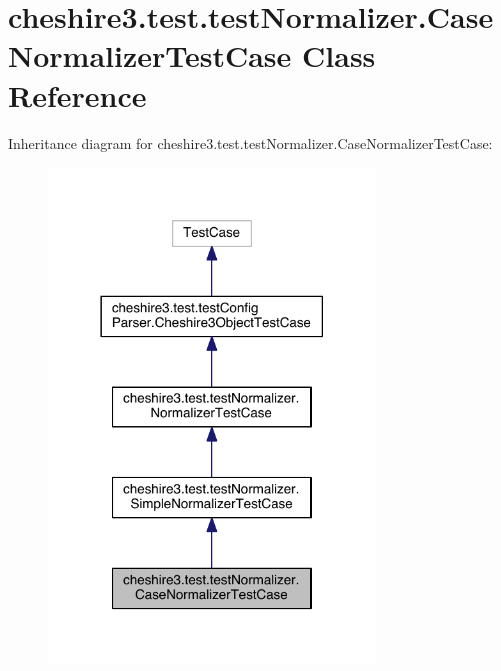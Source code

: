 \hypertarget{classcheshire3_1_1test_1_1test_normalizer_1_1_case_normalizer_test_case}{\section{cheshire3.\-test.\-test\-Normalizer.\-Case\-Normalizer\-Test\-Case Class Reference}
\label{classcheshire3_1_1test_1_1test_normalizer_1_1_case_normalizer_test_case}
}


Inheritance diagram for cheshire3.\-test.\-test\-Normalizer.\-Case\-Normalizer\-Test\-Case\-:
\nopagebreak
\begin{figure}[H]
\begin{center}
\leavevmode
\includegraphics[width=246pt]{classcheshire3_1_1test_1_1test_normalizer_1_1_case_normalizer_test_case__inherit__graph}
\end{center}
\end{figure}


